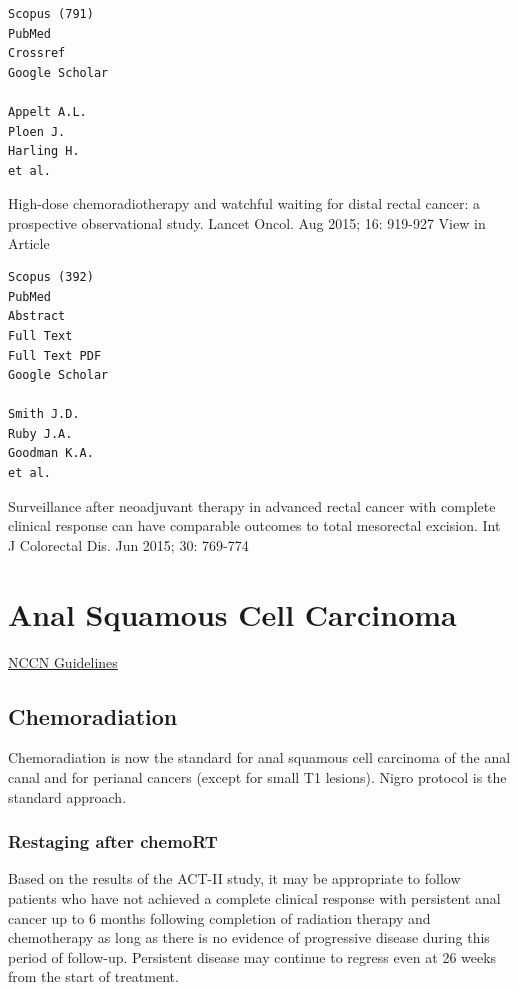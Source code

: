 \documentclass[
]{book}
\begin{document}
\begin{verbatim}
Scopus (791)
PubMed
Crossref
Google Scholar

Appelt A.L.
Ploen J.
Harling H.
et al.
\end{verbatim}

High-dose chemoradiotherapy and watchful waiting for distal rectal cancer: a prospective observational study.
Lancet Oncol. Aug 2015; 16: 919-927
View in Article

\begin{verbatim}
Scopus (392)
PubMed
Abstract
Full Text
Full Text PDF
Google Scholar

Smith J.D.
Ruby J.A.
Goodman K.A.
et al.
\end{verbatim}

Surveillance after neoadjuvant therapy in advanced rectal cancer with complete clinical response can have comparable outcomes to total mesorectal excision.
Int J Colorectal Dis. Jun 2015; 30: 769-774

\hypertarget{anal-squamous-cell-carcinoma}{%
\chapter{Anal Squamous Cell Carcinoma}\label{anal-squamous-cell-carcinoma}}

\href{https://www.nccn.org/professionals/physician_gls/pdf/anal_blocks.pdf}{NCCN Guidelines}

\hypertarget{chemoradiation}{%
\section{Chemoradiation}\label{chemoradiation}}

Chemoradiation is now the standard for anal squamous cell carcinoma of the anal canal and for perianal cancers (except for small T1 lesions). Nigro protocol is the standard approach.\citep{nigro1826}

\hypertarget{restaging-after-chemort}{%
\subsection{Restaging after chemoRT}\label{restaging-after-chemort}}

Based on the results of the ACT-II study, it may be appropriate to follow patients who have not achieved a complete clinical response with persistent anal cancer up to 6 months following completion of radiation therapy and chemotherapy as long as there is no evidence of progressive disease during this period of follow-up. Persistent disease may continue to regress even at 26 weeks from the start of treatment.\citep{james516}
\end{document}

